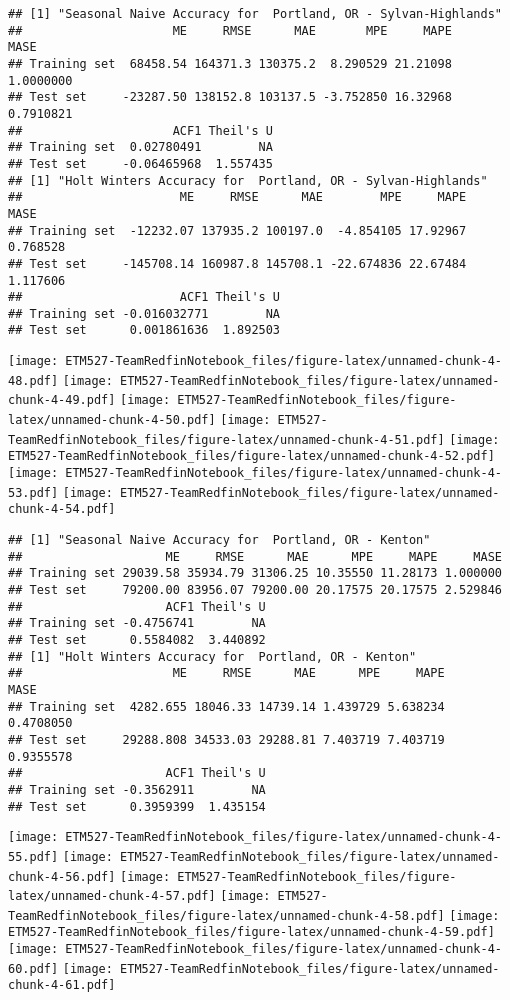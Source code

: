 \documentclass[]{article}
\begin{document}
\begin{verbatim}
## [1] "Seasonal Naive Accuracy for  Portland, OR - Sylvan-Highlands"
##                     ME     RMSE      MAE       MPE     MAPE      MASE
## Training set  68458.54 164371.3 130375.2  8.290529 21.21098 1.0000000
## Test set     -23287.50 138152.8 103137.5 -3.752850 16.32968 0.7910821
##                     ACF1 Theil's U
## Training set  0.02780491        NA
## Test set     -0.06465968  1.557435
## [1] "Holt Winters Accuracy for  Portland, OR - Sylvan-Highlands"
##                      ME     RMSE      MAE        MPE     MAPE     MASE
## Training set  -12232.07 137935.2 100197.0  -4.854105 17.92967 0.768528
## Test set     -145708.14 160987.8 145708.1 -22.674836 22.67484 1.117606
##                      ACF1 Theil's U
## Training set -0.016032771        NA
## Test set      0.001861636  1.892503
\end{verbatim}

\texttt{[image: ETM527-TeamRedfinNotebook\_files/figure-latex/unnamed-chunk-4-48.pdf]}
\texttt{[image: ETM527-TeamRedfinNotebook\_files/figure-latex/unnamed-chunk-4-49.pdf]}
\texttt{[image: ETM527-TeamRedfinNotebook\_files/figure-latex/unnamed-chunk-4-50.pdf]}
\texttt{[image: ETM527-TeamRedfinNotebook\_files/figure-latex/unnamed-chunk-4-51.pdf]}
\texttt{[image: ETM527-TeamRedfinNotebook\_files/figure-latex/unnamed-chunk-4-52.pdf]}
\texttt{[image: ETM527-TeamRedfinNotebook\_files/figure-latex/unnamed-chunk-4-53.pdf]}
\texttt{[image: ETM527-TeamRedfinNotebook\_files/figure-latex/unnamed-chunk-4-54.pdf]}

\begin{verbatim}
## [1] "Seasonal Naive Accuracy for  Portland, OR - Kenton"
##                    ME     RMSE      MAE      MPE     MAPE     MASE
## Training set 29039.58 35934.79 31306.25 10.35550 11.28173 1.000000
## Test set     79200.00 83956.07 79200.00 20.17575 20.17575 2.529846
##                    ACF1 Theil's U
## Training set -0.4756741        NA
## Test set      0.5584082  3.440892
## [1] "Holt Winters Accuracy for  Portland, OR - Kenton"
##                     ME     RMSE      MAE      MPE     MAPE      MASE
## Training set  4282.655 18046.33 14739.14 1.439729 5.638234 0.4708050
## Test set     29288.808 34533.03 29288.81 7.403719 7.403719 0.9355578
##                    ACF1 Theil's U
## Training set -0.3562911        NA
## Test set      0.3959399  1.435154
\end{verbatim}

\texttt{[image: ETM527-TeamRedfinNotebook\_files/figure-latex/unnamed-chunk-4-55.pdf]}
\texttt{[image: ETM527-TeamRedfinNotebook\_files/figure-latex/unnamed-chunk-4-56.pdf]}
\texttt{[image: ETM527-TeamRedfinNotebook\_files/figure-latex/unnamed-chunk-4-57.pdf]}
\texttt{[image: ETM527-TeamRedfinNotebook\_files/figure-latex/unnamed-chunk-4-58.pdf]}
\texttt{[image: ETM527-TeamRedfinNotebook\_files/figure-latex/unnamed-chunk-4-59.pdf]}
\texttt{[image: ETM527-TeamRedfinNotebook\_files/figure-latex/unnamed-chunk-4-60.pdf]}
\texttt{[image: ETM527-TeamRedfinNotebook\_files/figure-latex/unnamed-chunk-4-61.pdf]}
\end{document}
